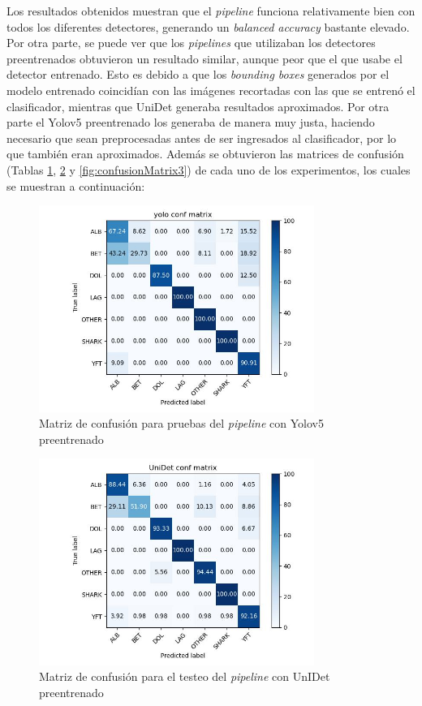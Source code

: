 Los resultados obtenidos muestran que el \textit{pipeline} funciona relativamente bien con todos los diferentes detectores, generando un \textit{balanced accuracy} bastante elevado. Por otra parte, se puede ver que los \textit{pipelines} que utilizaban los detectores preentrenados obtuvieron un resultado similar, aunque peor que el que usabe el detector entrenado. Esto es debido a que los \textit{bounding boxes} generados por el modelo entrenado coincidían con las imágenes recortadas con las que se entrenó el clasificador, mientras que UniDet generaba resultados aproximados. Por otra parte el Yolov5 preentrenado los generaba de manera muy justa, haciendo necesario que sean preprocesadas antes de ser ingresados al clasificador, por lo que también eran aproximados.
Además se obtuvieron las matrices de confusión (Tablas \ref{fig:confusionMatrix1}, \ref{fig:confusionMatrix2} y \ref{fig:confusionMatrix3}) de cada uno de los experimentos, los cuales se muestran a continuación:

\begin{figure}[h!]
\centering
\includegraphics[width=0.8\textwidth]{images/yolo_conf_matrix.jpg}
\caption{Matriz de confusión para pruebas del \textit{pipeline} con Yolov5 preentrenado }
\label{fig:confusionMatrix1}
\end{figure}

\begin{figure}[h!]
\centering
\includegraphics[width=0.8\textwidth]{images/UniDet_conf_matrix.jpg}
\caption{Matriz de confusión para el testeo del \textit{pipeline} con UnIDet preentrenado }
\label{fig:confusionMatrix2}
\end{figure}

